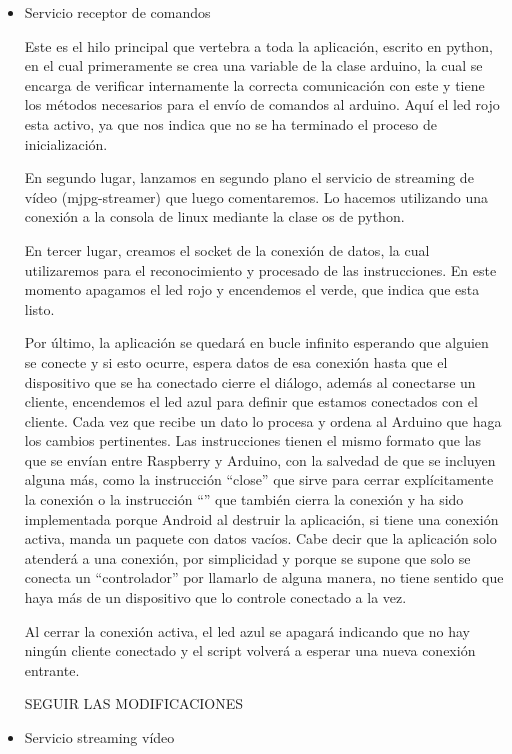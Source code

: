 \documentclass{pclass}
\begin{document}
\begin{itemize}
\begin{itemize}
	\medskip
	
	\item Servicio receptor de comandos
	
	Este es el hilo principal que vertebra a toda la aplicación, escrito en python, en el cual primeramente se crea una variable de la clase arduino, la cual se encarga de verificar internamente la correcta comunicación con este y tiene los métodos necesarios para el envío de comandos al arduino. Aquí el led rojo esta activo, ya que nos indica que no se ha terminado el proceso de inicialización.
	
	En segundo lugar, lanzamos en segundo plano el servicio de streaming de vídeo (mjpg-streamer) que luego comentaremos. Lo hacemos utilizando una conexión a la consola de linux mediante la clase os de python. 
	
	En tercer lugar, creamos el socket de la conexión de datos, la cual utilizaremos para el reconocimiento y procesado de las instrucciones. En este momento apagamos el led rojo y encendemos el verde, que indica que esta listo.
	
	Por último, la aplicación se quedará en bucle infinito esperando que alguien se conecte y si esto ocurre, espera datos de esa conexión hasta que el dispositivo que se ha conectado cierre el diálogo, además al conectarse un cliente, encendemos el led azul para definir que estamos conectados con el cliente. Cada vez que recibe un dato lo procesa y ordena al Arduino que haga los cambios pertinentes. Las instrucciones tienen el mismo formato que las que se envían entre Raspberry y Arduino, con la salvedad de que se incluyen alguna más, como la instrucción ``close'' que sirve para cerrar explícitamente la conexión o la instrucción ``'' que también cierra la conexión y ha sido implementada porque Android al destruir la aplicación, si tiene una conexión activa, manda un paquete con datos vacíos. Cabe decir que la aplicación solo atenderá a una conexión, por simplicidad y porque se supone que solo se conecta un ``controlador'' por llamarlo de alguna manera, no tiene sentido que haya más de un dispositivo que lo controle conectado a la vez. 
	
	Al cerrar la conexión activa, el led azul se apagará indicando que no hay ningún cliente conectado y el script volverá a esperar una nueva conexión entrante.
	
		 SEGUIR LAS MODIFICACIONES
	
	\medskip
	
	\item Servicio streaming vídeo
	

\end{itemize}
\end{itemize}
\end{document}
